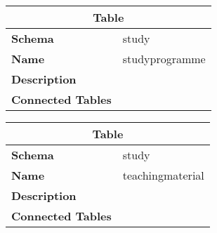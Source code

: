 \begin{table}[H]
	\renewcommand{\arraystretch}{2}
	\centering
	\begin{tabular}{|p{}|p{}|}
		\hline
		\multicolumn{2}{|c|}{\textbf{Table}} \\ \hline
		\textbf{Schema}               & study \\ \hline
		\textbf{Name}                 & studyprogramme \\ \hline
		\textbf{Description}          &      \\ \hline
		\textbf{Connected Tables}     &      \\ \hline
	\end{tabular}
\end{table}

\begin{table}[H]
	\renewcommand{\arraystretch}{2}
	\centering
	\begin{tabular}{|p{}|p{}|}
		\hline
		\multicolumn{2}{|c|}{\textbf{Table}} \\ \hline
		\textbf{Schema}               & study \\ \hline
		\textbf{Name}                 & teachingmaterial \\ \hline
		\textbf{Description}          &      \\ \hline
		\textbf{Connected Tables}     &      \\ \hline
	\end{tabular}
\end{table}